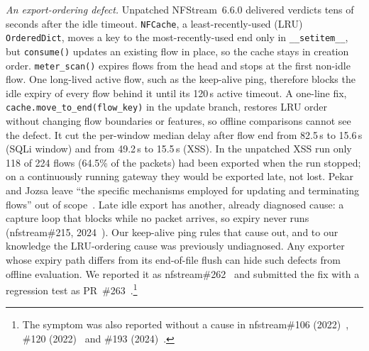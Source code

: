 \emph{An export-ordering defect.} Unpatched NFStream~6.6.0 delivered verdicts tens of seconds after the idle timeout. \texttt{NFCache}, a least-recently-used (LRU) \texttt{OrderedDict}, moves a key to the most-recently-used end only in \texttt{\_\_setitem\_\_}, but \texttt{consume()} updates an existing flow in place, so the cache stays in creation order. \texttt{meter\_scan()} expires flows from the head and stops at the first non-idle flow. One long-lived active flow, such as the keep-alive ping, therefore blocks the idle expiry of every flow behind it until its 120\,s active timeout. A one-line fix, \texttt{cache.move\_to\_end(flow\_key)} in the update branch, restores LRU order without changing flow boundaries or features, so offline comparisons cannot see the defect. It cut the per-window median delay after flow end from 82.5\,s to 15.6\,s (SQLi window) and from 49.2\,s to 15.5\,s (XSS). In the unpatched XSS run only 118 of 224 flows (64.5\% of the packets) had been exported when the run stopped; on a continuously running gateway they would be exported late, not lost. Pekar and Jozsa leave ``the specific mechanisms employed for updating and terminating flows'' out of scope~\cite{pekar2024integrity}. Late idle export has another, already diagnosed cause: a capture loop that blocks while no packet arrives, so expiry never runs (nfstream\#215, 2024~\cite{nfstream215}). Our keep-alive ping rules that cause out, and to our knowledge the LRU-ordering cause was previously undiagnosed. Any exporter whose expiry path differs from its end-of-file flush can hide such defects from offline evaluation. We reported it as nfstream\#262~\cite{nfstream262} and submitted the fix with a regression test as PR~\#263~\cite{nfstream263}.\footnote{The symptom was also reported without a cause in nfstream\#106 (2022)~\cite{nfstream106}, \#120 (2022)~\cite{nfstream120} and \#193 (2024)~\cite{nfstream193}.}
